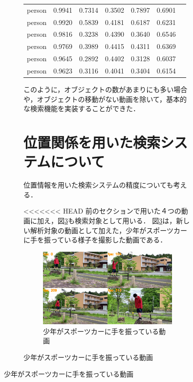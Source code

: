 \documentclass[a4j,12pt,dvipdfmx]{jreport}
\begin{document}
\begin{figure}[H]
\begin{figure}[H]
\begin{table}[b]
\begin{tabular}{ccccccc}
    person & 0.9941 & 0.7314 & 0.3502 & 0.7897 & 0.6901 \\
    person & 0.9920 & 0.5839 & 0.4181 & 0.6187 & 0.6231 \\
    person & 0.9816 & 0.3238 & 0.4390 & 0.3640 & 0.6546 \\
    person & 0.9769 & 0.3989 & 0.4415 & 0.4311 & 0.6369 \\
    person & 0.9645 & 0.2892 & 0.4402 & 0.3128 & 0.6037 \\
    person & 0.9623 & 0.3116 & 0.4041 & 0.3404 & 0.6154 \\
    \bottomrule
  \end{tabular}
\end{table}

このように，オブジェクトの数があまりにも多い場合や，オブジェクトの移動がない動画を除いて，基本的な検索機能を実装することができた．

\section{位置関係を用いた検索システムについて}
位置情報を用いた検索システムの精度についても考える．

<<<<<<< HEAD
前のセクションで用いた４つの動画に加え，図\ref{fig:movie6}も検索対象として用いる．
図\ref{fig:movie6}は，新しい解析対象の動画として加えた，少年がスポーツカーに手を振っている様子を撮影した動画である．
\begin{figure}[H]
  \centering
  \includegraphics[width=13cm]{image/6_result.jpg}
  \caption{少年がスポーツカーに手を振っている動画}
  \label{fig:movie6}
\end{figure}


\end{figure}
\end{figure}
\end{document}
